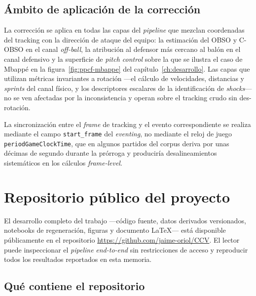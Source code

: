 \section{Ámbito de aplicación de la corrección}
\label{anexo:espejo-ambito}

La corrección se aplica en todas las capas del \textit{pipeline} que
mezclan coordenadas del tracking con la dirección de ataque del
equipo: la estimación del OBSO y C-OBSO en el canal \textit{off-ball},
la atribución al defensor más cercano al balón en el canal
defensivo y la superficie de \textit{pitch control} sobre la que se
ilustra el caso de Mbappé en la figura~\ref{fig:ppcf-mbappe} del
capítulo~\ref{ch:desarrollo}. Las capas que utilizan métricas
invariantes a rotación ---el cálculo de velocidades, distancias y
\textit{sprints} del canal físico, y los descriptores escalares de la
identificación de \textit{shocks}--- no se ven afectadas por la
inconsistencia y operan sobre el tracking crudo sin des-rotación.

La sincronización entre el \textit{frame} de tracking y el evento
correspondiente se realiza mediante el campo \texttt{start\_frame}
del \textit{eventing}, no mediante el reloj de juego
\texttt{periodGameClockTime}, que en algunos partidos del corpus
deriva por unas décimas de segundo durante la prórroga y produciría
desalineamientos sistemáticos en los cálculos \textit{frame-level}.


\chapter{Repositorio público del proyecto}
\label{anexo:repo}

El desarrollo completo del trabajo ---código fuente, datos
derivados versionados, notebooks de regeneración, figuras y documento
\LaTeX{}--- está disponible públicamente en el repositorio
\url{https://github.com/jaime-oriol/CCV}. El lector puede inspeccionar
el \textit{pipeline} \textit{end-to-end} sin restricciones de acceso
y reproducir todos los resultados reportados en esta memoria.

\section{Qué contiene el repositorio}
\label{anexo:repo-contenido}

